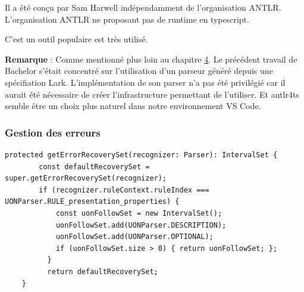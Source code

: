 \documentclass[
    iict, %
    il, %
]{heig-tb}
\begin{document}
Il a été conçu par Sam Harwell indépendamment de l'organisation ANTLR.
L'organisation ANTLR ne proposant pas de runtime en typescript. %



C'est un outil populaire est très utilisé.

\textbf{Remarque} :
Comme mentionné plus loin au chapitre \hyperref[grammar scope]{4}. Le précédent travail de Bachelor s'était concentré sur l'utilisation d'un parseur généré depuis une spécifiation Lark.
L'implémentation de son parser n'a pas été privilégié car il aurait été nécessaire de créer l'infrastructure permettant de l'utiliser.
Et antlr4ts semble être un choix plus naturel dans notre environnement VS Code.


\subsubsection{Gestion des erreurs}


\begin{lstlisting}[frame=single,caption={getErrorRecoverySet},label={getErrorRecoverySet}]
    protected getErrorRecoverySet(recognizer: Parser): IntervalSet {
        const defaultRecoverySet = super.getErrorRecoverySet(recognizer);
        if (recognizer.ruleContext.ruleIndex === UONParser.RULE_presentation_properties) {
            const uonFollowSet = new IntervalSet();
            uonFollowSet.add(UONParser.DESCRIPTION);
            uonFollowSet.add(UONParser.OPTIONAL);
            if (uonFollowSet.size > 0) { return uonFollowSet; };
          }
          return defaultRecoverySet;
    }

\end{lstlisting}


\end{document}
